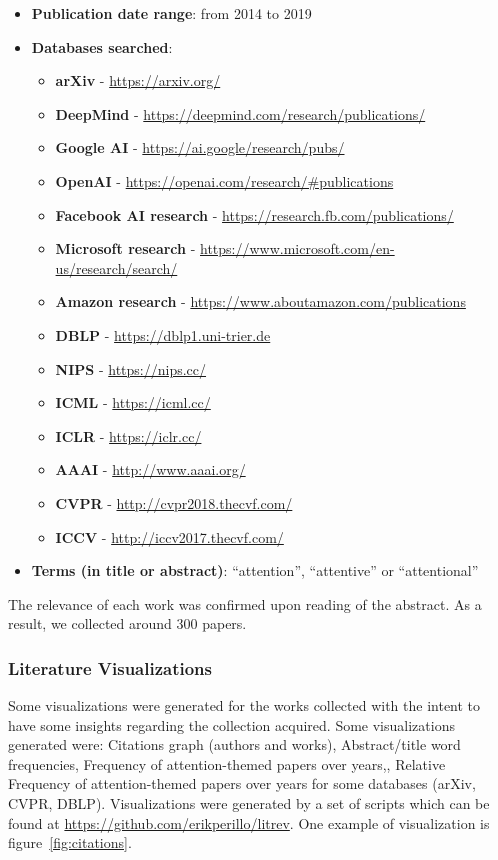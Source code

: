 \documentclass[12pt]{article}
\begin{document}
\begin{itemize}
    \item \textbf{Publication date range}: from 2014 to 2019
    \item \textbf{Databases searched}:
    \begin{itemize}
        \item \textbf{arXiv} - \url{https://arxiv.org/}
        \item \textbf{DeepMind} - \url{https://deepmind.com/research/publications/}
        \item \textbf{Google AI} - \url{https://ai.google/research/pubs/}
        \item \textbf{OpenAI} - \url{https://openai.com/research/#publications}
        \item \textbf{Facebook AI research} - \url{https://research.fb.com/publications/}
        \item \textbf{Microsoft research} - \url{https://www.microsoft.com/en-us/research/search/}
        \item \textbf{Amazon research} - \url{https://www.aboutamazon.com/publications}
        \item \textbf{DBLP} - \url{https://dblp1.uni-trier.de}
        \item \textbf{NIPS} - \url{https://nips.cc/}
        \item \textbf{ICML} - \url{https://icml.cc/}
        \item \textbf{ICLR} - \url{https://iclr.cc/}
        \item \textbf{AAAI} - \url{http://www.aaai.org/}
        \item \textbf{CVPR} - \url{http://cvpr2018.thecvf.com/}
        \item \textbf{ICCV} - \url{http://iccv2017.thecvf.com/}
    \end{itemize}
    \item \textbf{Terms (in title or abstract)}: ``attention'',
        ``attentive'' or ``attentional''
\end{itemize}

The relevance of each work was confirmed upon reading of the abstract.
As a result, we collected around 300 papers.

\subsubsection{Literature Visualizations}
Some visualizations were generated for the works collected with the intent
to have some insights regarding the collection acquired.
Some visualizations generated were: Citations graph (authors and works),
Abstract/title word frequencies, Frequency of attention-themed papers over years,,
Relative Frequency of attention-themed papers over years for some databases (arXiv, CVPR, DBLP).
Visualizations were generated by a set of scripts which can be found at \url{https://github.com/erikperillo/litrev}.
One example of visualization is figure~\ref{fig:citations}.
\end{document}
